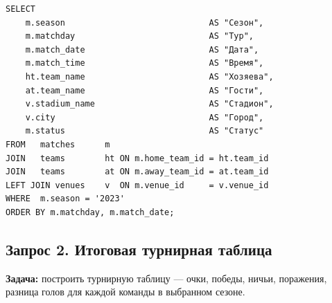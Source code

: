 \documentclass[14pt,a4paper]{extarticle}
\begin{document}
\begin{listing}[H]
\caption{Расписание турнира (сезон 2023)}
\begin{verbatim}
SELECT
    m.season                             AS "Сезон",
    m.matchday                           AS "Тур",
    m.match_date                         AS "Дата",
    m.match_time                         AS "Время",
    ht.team_name                         AS "Хозяева",
    at.team_name                         AS "Гости",
    v.stadium_name                       AS "Стадион",
    v.city                               AS "Город",
    m.status                             AS "Статус"
FROM   matches      m
JOIN   teams        ht ON m.home_team_id = ht.team_id
JOIN   teams        at ON m.away_team_id = at.team_id
LEFT JOIN venues    v  ON m.venue_id     = v.venue_id
WHERE  m.season = '2023'
ORDER BY m.matchday, m.match_date;
\end{verbatim}
\end{listing}

\subsection{Запрос 2. Итоговая турнирная таблица}

\textbf{Задача:} построить турнирную таблицу — очки, победы, ничьи, поражения,
разница голов для каждой команды в выбранном сезоне.
\end{document}
